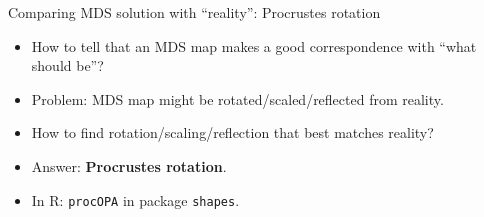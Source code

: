 \documentclass[unknownkeysallowed]{beamer}\usepackage[]{graphicx}\usepackage[]{color}
\makeatletter
\newcommand{\hlopt}[1]{\textcolor[rgb]{0,0,0}{#1}}%
\newcommand{\hlstd}[1]{\textcolor[rgb]{0.345,0.345,0.345}{#1}}%
\newcommand{\hlkwc}[1]{\textcolor[rgb]{0.333,0.667,0.333}{#1}}%
\newcommand{\hlkwd}[1]{\textcolor[rgb]{0.737,0.353,0.396}{\textbf{#1}}}%
\newenvironment{kframe}{%
 \def\at@end@of@kframe{}%
 \ifinner\ifhmode%
  \def\at@end@of@kframe{\end{minipage}}%
  \begin{minipage}{\columnwidth}%
 \fi\fi%
 \def\FrameCommand##1{\hskip\@totalleftmargin \hskip-\fboxsep
 \colorbox{shadecolor}{##1}\hskip-\fboxsep
     \hskip-\linewidth \hskip-\@totalleftmargin \hskip\columnwidth}%
 \MakeFramed {\advance\hsize-\width
   \@totalleftmargin\z@ \linewidth\hsize
   \@setminipage}}%
 {\par\unskip\endMakeFramed%
 \at@end@of@kframe}
\newenvironment{knitrout}{}{} %
\makeatother
\begin{document}

\begin{frame}[fragile]{Comparing MDS solution with ``reality'':
    Procrustes rotation}
  
  \begin{itemize}
  \item How to tell that an MDS map makes a good correspondence with ``what
    should be''?
  \item Problem: MDS map might be rotated/scaled/reflected from reality.
  \item How to find rotation/scaling/reflection that best matches reality?
  \item Answer: \textbf{Procrustes rotation}.
  \item In R: \texttt{procOPA} in package \texttt{shapes}.
  \end{itemize}
  
\end{frame}
\end{document}
